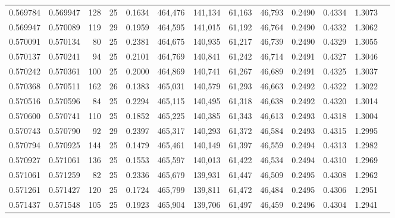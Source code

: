\begin{tabular}{rrrrrrrrrrrrr}
0.569784 & 0.569947 & 128 &  25 &                                     0.1634 & 464,476 & 141,134 &  61,163 &  46,793 & 0.2490 & 0.4334 & 1.3073 \\
0.569947 & 0.570089 & 119 &  29 &                                     0.1959 & 464,595 & 141,015 &  61,192 &  46,764 & 0.2490 & 0.4332 & 1.3062 \\
0.570091 & 0.570134 &  80 &  25 &                                     0.2381 & 464,675 & 140,935 &  61,217 &  46,739 & 0.2490 & 0.4329 & 1.3055 \\
0.570137 & 0.570241 &  94 &  25 &                                     0.2101 & 464,769 & 140,841 &  61,242 &  46,714 & 0.2491 & 0.4327 & 1.3046 \\
0.570242 & 0.570361 & 100 &  25 &                                     0.2000 & 464,869 & 140,741 &  61,267 &  46,689 & 0.2491 & 0.4325 & 1.3037 \\
0.570368 & 0.570511 & 162 &  26 &                                     0.1383 & 465,031 & 140,579 &  61,293 &  46,663 & 0.2492 & 0.4322 & 1.3022 \\
0.570516 & 0.570596 &  84 &  25 &                                     0.2294 & 465,115 & 140,495 &  61,318 &  46,638 & 0.2492 & 0.4320 & 1.3014 \\
0.570600 & 0.570741 & 110 &  25 &                                     0.1852 & 465,225 & 140,385 &  61,343 &  46,613 & 0.2493 & 0.4318 & 1.3004 \\
0.570743 & 0.570790 &  92 &  29 &                                     0.2397 & 465,317 & 140,293 &  61,372 &  46,584 & 0.2493 & 0.4315 & 1.2995 \\
0.570794 & 0.570925 & 144 &  25 &                                     0.1479 & 465,461 & 140,149 &  61,397 &  46,559 & 0.2494 & 0.4313 & 1.2982 \\
0.570927 & 0.571061 & 136 &  25 &                                     0.1553 & 465,597 & 140,013 &  61,422 &  46,534 & 0.2494 & 0.4310 & 1.2969 \\
0.571061 & 0.571259 &  82 &  25 &                                     0.2336 & 465,679 & 139,931 &  61,447 &  46,509 & 0.2495 & 0.4308 & 1.2962 \\
0.571261 & 0.571427 & 120 &  25 &                                     0.1724 & 465,799 & 139,811 &  61,472 &  46,484 & 0.2495 & 0.4306 & 1.2951 \\
0.571437 & 0.571548 & 105 &  25 &                                     0.1923 & 465,904 & 139,706 &  61,497 &  46,459 & 0.2496 & 0.4304 & 1.2941 \\

\end{tabular}

